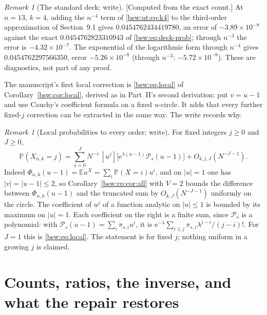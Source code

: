\documentclass[11pt,letterpaper]{article}
\theoremstyle{definition}
\theoremstyle{remark}
\newtheorem{remark}[theorem]{Remark}
\newcommand{\EE}{\mathbb E}
\newcommand{\PP}{\mathbb P}
\newcommand{\ee}{\mathrm e}
\newcommand{\coef}[2]{[#1]#2}
\begin{document}
\begin{remark}[The standard deck; write]\label{bsw:ut:rem:deck}
[Computed from the exact count.]  At $n=13$, $k=4$, adding the
$n^{-4}$ term of \eqref{bsw:ut:eq:k4} to the third-order approximation of
Section~9.1 gives $0.0454762434419780$, an error of $-3.89\times10^{-8}$
against the exact $0.0454762823310943$ of \eqref{bsw:eq:deck-prob}; through
$n^{-3}$ the error is $-4.32\times10^{-7}$.  The exponential of the
logarithmic form through $n^{-4}$ gives $0.0454762297566350$, error
$-5.26\times10^{-8}$ (through $n^{-3}$: $-5.72\times10^{-8}$).  These are
diagnostics, not part of any proof.
\end{remark}

The manuscript's first local correction is \eqref{bsw:eq:local} of
Corollary~\ref{bsw:cor:local}, derived as in Part~II's second derivation:
put $v=u-1$ and use Cauchy's coefficient formula on a fixed $u$-circle.
It adds that every further fixed-$j$ correction can be extracted in the
same way.  The write records why.

\begin{remark}[Local probabilities to every order; write]
\label{bsw:ut:rem:local}
For fixed integers $j\ge0$ and $J\ge0$,
\[
 \PP(X_{n,k}=j)=\sum_{s=0}^J N^{-s}\,\coef{u^j}{\bigl[\ee^{\lambda(u-1)}
 \mathcal P_s(u-1)\bigr]}+O_{k,j,J}(N^{-J-1}).
\]
Indeed $\Phi_{n,k}(u-1)=\EE u^X=\sum_i\PP(X=i)u^i$, and on $|u|=1$ one has
$|v|=|u-1|\le2$, so Corollary~\ref{bsw:rp:cor:all} with $V=2$ bounds the
difference between $\Phi_{n,k}(u-1)$ and the truncated sum by
$O_{k,J}(N^{-J-1})$ uniformly on the circle.  The coefficient of $u^j$ of
a function analytic on $|u|\le1$ is bounded by its maximum on $|u|=1$.
Each coefficient on the right is a finite sum, since $\mathcal P_s$ is a
polynomial: with $\mathcal P_s(u-1)=\sum_i\pi_{s,i}u^i$, it is
$\ee^{-\lambda}\sum_{i\le j}\pi_{s,i}\lambda^{j-i}/(j-i)!$.  For $J=1$ this
is \eqref{bsw:eq:local}.  The statement is for fixed $j$; nothing uniform
in a growing $j$ is claimed.
\end{remark}

\section{Counts, ratios, the inverse, and what the repair restores}
\label{bsw:ut:sec:inverse}
\end{document}
